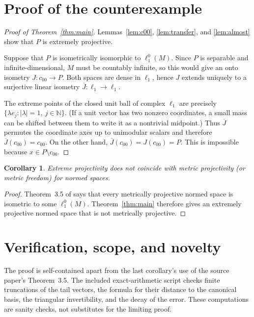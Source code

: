 \documentclass[11pt]{article}
\newtheorem{corollary}[theorem]{Corollary}
\newcommand{\N}{\mathbb N}
\begin{document}
\section{Proof of the counterexample}

\begin{proof}[Proof of Theorem~\ref{thm:main}]
Lemmas~\ref{lem:c00}, \ref{lem:transfer}, and \ref{lem:almost} show that $P$
is extremely projective.

Suppose that $P$ is isometrically isomorphic to $\ell_1^0(M)$.  Since $P$ is
separable and infinite-dimensional, $M$ must be countably infinite, so this
would give an onto isometry $J:c_{00}\to P$.  Both spaces are dense in
$\ell_1$, hence $J$ extends uniquely to a surjective linear isometry
$\overline J:\ell_1\to\ell_1$.

The extreme points of the closed unit ball of complex $\ell_1$ are precisely
$\{\lambda e_j:|\lambda|=1,\ j\in\N\}$.  (If a unit vector has two nonzero
coordinates, a small mass can be shifted between them to write it as a
nontrivial midpoint.)  Thus $\overline J$ permutes the coordinate axes up to
unimodular scalars and therefore
$\overline J(c_{00})=c_{00}$.  On the other hand,
$\overline J(c_{00})=J(c_{00})=P$.  This is impossible because
$x\in P\setminus c_{00}$.
\end{proof}

\begin{corollary}
Extreme projectivity does not coincide with metric projectivity (or metric
freedom) for normed spaces.
\end{corollary}

\begin{proof}
Theorem~3.5 of \cite{Hel12} says that every metrically projective normed space
is isometric to some $\ell_1^0(M)$.  Theorem~\ref{thm:main} therefore gives an
extremely projective normed space that is not metrically projective.
\end{proof}

\section{Verification, scope, and novelty}

The proof is self-contained apart from the last corollary's use of the source
paper's Theorem~3.5.  The included exact-arithmetic script checks finite
truncations of the tail vectors, the formula for their distance to the
canonical basis, the triangular invertibility, and the decay of the error.
These computations are sanity checks, not substitutes for the limiting proof.
\end{document}
